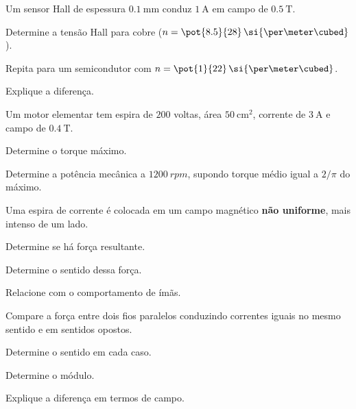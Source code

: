 \begin{questao}[3]{}

Um sensor Hall de espessura $\SI{0.1}{\milli\meter}$ conduz
$\SI{1}{\ampere}$ em campo de $\SI{0.5}{\tesla}$.
\begin{itensq}
\item Determine a tensão Hall para cobre ($n=\pot{8.5}{28}\,\si{\per\meter\cubed}$).
\item Repita para um semicondutor com $n=\pot{1}{22}\,\si{\per\meter\cubed}$.
\item Explique a diferença.
\end{itensq}


\end{questao}
\begin{questao}[3]{}

Um motor elementar tem espira de $200$ voltas, área
$\SI{50}{\centi\meter\squared}$, corrente de $\SI{3}{\ampere}$ e campo de
$\SI{0.4}{\tesla}$.
\begin{itensq}
\item Determine o torque máximo.
\item Determine a potência mecânica a $\SI{1200}{rpm}$, supondo torque médio
      igual a $2/\pi$ do máximo.
\end{itensq}


\end{questao}
\begin{questao}[3]{}

Uma espira de corrente é colocada em um campo magnético \textbf{não uniforme},
mais intenso de um lado.
\begin{itensq}
\item Determine se há força resultante.
\item Determine o sentido dessa força.
\item Relacione com o comportamento de ímãs.
\end{itensq}


\end{questao}
\begin{questao}[3]{}

Compare a força entre dois fios paralelos conduzindo correntes iguais no mesmo
sentido e em sentidos opostos.
\begin{itensq}
\item Determine o sentido em cada caso.
\item Determine o módulo.
\item Explique a diferença em termos de campo.
\end{itensq}


\end{questao}

